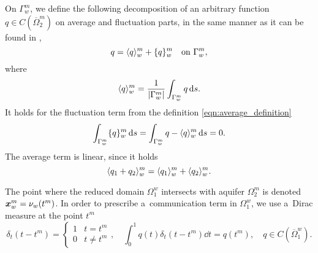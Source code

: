 On $\Gamma^m_w$, we define the following decomposition of an arbitrary function $q\in C(\overbar\Omega^m_2)$ on average and fluctuation parts, 
in the same manner as it can be found in \cite{koppl_vidotto_2018},
\begin{equation}\label{eqn:average_decomposition}
    q = \langle q\rangle^m_w + \{q\}^m_w \quad \textrm{on } \Gamma^m_w,
\end{equation}
where
\begin{equation} \label{eqn:average_definition}
    \langle q\rangle^m_w = \frac{1}{{\left|\Gamma^m_w\right|}} \int_{\Gamma^m_w} q \,{\rm d} s.
\end{equation}
It holds for the fluctuation term from the definition \eqref{eqn:average_definition}
\begin{equation}
\int_{\Gamma^m_w} \{q\}^m_w \,{\rm d} s = \int_{\Gamma^m_w} q - \langle q\rangle^m_w \,{\rm d} s = 0.
\end{equation}
The average term is linear, since it holds 
\begin{equation}
    \langle q_1+q_2\rangle^m_w = \langle q_1\rangle^m_w + \langle q_2\rangle^m_w.
\end{equation}

The point where the reduced domain $\Omega^w_1$ intersects with aquifer $\Omega^m_2$ is denoted $\mathbf{\boldsymbol{x}}^m_w=\nu_w(t^m)$.
In order to prescribe a~communication term in $\Omega^w_1$, we use a~Dirac measure at the point $t^m$
\begin{equation}
    \delta_t(t - t^m) = 
    \begin{cases}
        1 & t = t^m \\
        0 & t \neq t^m
    \end{cases}, 
    \quad \int_0^1 q(t) \delta_t(t - t^m) \dd t = q(t^m), \quad q\in C(\overbar\Omega^w_1).
\end{equation}

